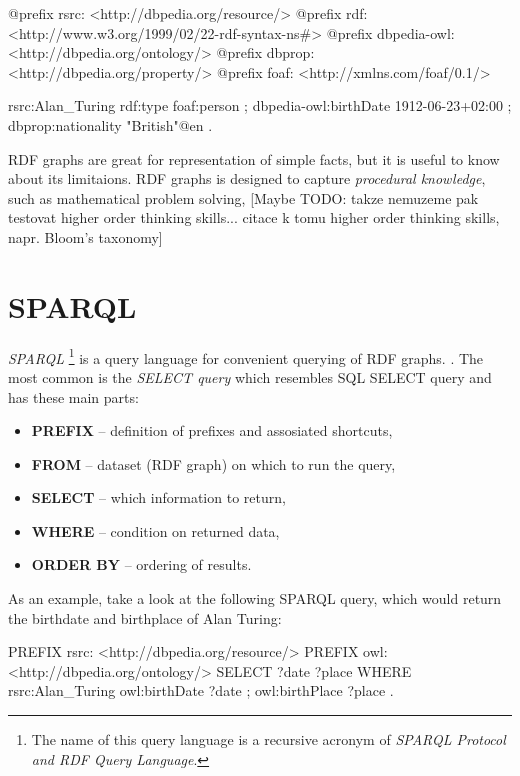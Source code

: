\documentclass[a4paper, 12pt, twoside]{fithesis2}		%
\renewcommand{\_}{\leavevmode \kern0.07em\vbox{\hrule width0.4em}}
\newcommand{\squarebullet}{\textcolor{black}{\raisebox{0.15em}{\rule{4pt}{4pt}}}}
\newcommand{\emptysquarebullet}{\textcolor{black}{\raisebox{0.10em}{\tiny$\square$}}}
\newenvironment{myItemize}{
  \begin{itemize}[leftmargin=2em,rightmargin=1em,itemsep=\parskip ,parsep=0em,topsep=0em,partopsep=0em]
  \renewcommand{\labelitemi}{\squarebullet}
  \renewcommand{\labelitemii}{\textbullet}
}{
  \end{itemize}
}
\begin{document}
\begin{code}
@prefix rsrc: <http://dbpedia.org/resource/>
@prefix rdf: <http://www.w3.org/1999/02/22-rdf-syntax-ns#>
@prefix dbpedia-owl: <http://dbpedia.org/ontology/>
@prefix dbprop: <http://dbpedia.org/property/>
@prefix foaf: <http://xmlns.com/foaf/0.1/>

rsrc:Alan_Turing
  rdf:type foaf:person ;
  dbpedia-owl:birthDate 1912-06-23+02:00 ;
  dbprop:nationality "British"@en .
\end{code}

RDF graphs are great for representation of simple facts, but it is useful to know about its limitaions. RDF graphs is designed to capture \textit{procedural knowledge}, such as mathematical problem solving,
[Maybe TODO: takze nemuzeme pak testovat higher order thinking skills... citace k tomu higher order thinking skills, napr. Bloom's taxonomy]


\section{SPARQL}
\label{sec:sparql}

\textit{SPARQL}%
\footnote{The name of this query language is a recursive acronym of \textit{SPARQL Protocol and RDF Query Language}.}
is a query language for convenient querying of RDF graphs. \parencite[][84]{semantic-web}.
The most common is the \textit{SELECT query} which resembles SQL SELECT query and has these main parts:
\begin{myItemize}
  \item \textbf{PREFIX} -- definition of prefixes and assosiated shortcuts,
  \item \textbf{FROM} -- dataset (RDF graph) on which to run the query,
  \item \textbf{SELECT} -- which information to return,
  \item \textbf{WHERE} -- condition on returned data,
  \item \textbf{ORDER BY} -- ordering of results.
\end{myItemize}
As an example, take a look at the following SPARQL query, which would return the birthdate and birthplace of Alan Turing:
\begin{code}
PREFIX rsrc: <http://dbpedia.org/resource/>
PREFIX owl: <http://dbpedia.org/ontology/>
SELECT ?date ?place
WHERE {
  rsrc:Alan_Turing owl:birthDate ?date ;
                   owl:birthPlace ?place .
}
\end{code}
\end{document}
